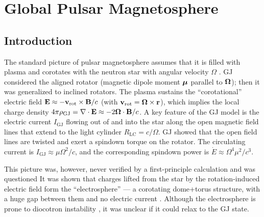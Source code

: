 
\def\bB{{\,\mathbf B}}
\def\bE{{\,\mathbf E}}
\def\bS{{\,\mathbf S}}
\def\bJ{{\,\mathbf J}}
\def\bv{{\,\mathbf v}}
\def\Rmax{R_{\rm max}}

\def\rhoGJ{\rho_{\rm GJ}}
\def\IGJ{I_{\rm GJ}}
\def\gthr{\gamma_{\rm thr}}
\def\RLC{R_{\rm LC}}
\def\Rout{R_{\rm out}}
\def\gmax{\gamma_{\max}}
\def\br{{\mathbf r}}
\def\Phipc{\Phi_0}
\def\Phithr{\Phi_\pm}
\def\Phimax{\Phi_\star}
\def\gamLC{\gamma_0}
\def\fLC{f_{\rm LC}}
\def\gdrag{\gamma_{\rm drag}}
\def\bvrot{\bv_{\rm rot}}
\def\Lsd{L_{\rm sd}}
\def\lav{\bar{l}}
\def\ldisp{\Delta l}
\def\Lin{L_{\rm in}}
\def\Rs{R_{\star}}
\def\rL{r_{\rm L}}
\def\dNi{\dot{N}_i}

\chapter{Global Pulsar Magnetosphere}
\label{chap:pulsar}

\section{Introduction}

The standard picture of pulsar magnetosphere assumes that it is
filled with plasma and  corotates with the neutron star with angular velocity $\Omega$
\citep[hereafter GJ]{goldreich_pulsar_1969}.  GJ considered the
aligned rotator (magnetic dipole moment $\bm{\mu}$ parallel to $\bm{\Omega}$);
then it was generalized to inclined rotators.  The
plasma sustains the ``corotational'' electric field $\mathbf{E}\approx
-\mathbf{v}_{\rm rot}\times \mathbf{B}/c$
(with $\mathbf{v}_\mathrm{rot}=\bOm\times\br$), which implies the local charge density
$4\pi\rho_\mathrm{GJ}=\nabla\cdot \mathbf{E} \approx -2\bm{\Omega}\cdot\mathbf{B}/c$.
A key feature of the GJ model is the electric current $I_\mathrm{GJ}$ flowing out of
and into the star along the open magnetic field lines that extend to
the light cylinder $R_\mathrm{LC}=c/\Omega$. GJ showed that the open field
lines are twisted and exert a spindown torque on the rotator.  The
circulating current is $I_\mathrm{GJ}\approx \mu \Omega^2/c$, and the
corresponding spindown power is $\dot{E}\approx \Omega^4\mu^2/c^3$.

This picture was, however, never verified by a first-principle calculation and
was questioned
\citep{michel_state_2004, gruzinov_aristotelian_2013}
It was shown that charges lifted from the star by the rotation-induced
electric field form the ``electrosphere''
--- a corotating dome+torus structure,
with a huge gap between them and no electric current
\citep{jackson_new_1976, krause-polstorff_electrosphere_1985}.
Although the electrosphere
is prone to diocotron instability
\citep{petri_diocotron_2002,spitkovsky_simulations_2002},
it was unclear if it could relax to the GJ state.

